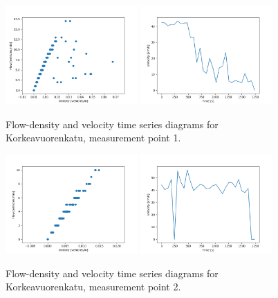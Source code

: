 \documentclass[english, 12pt, a4paper, elec, utf8, pdfa, online]{aaltothesis}
\begin{document}
\clearpage
\begin{figure}[ht!]
    \centering
    \includegraphics[width=0.45\textwidth]{graphs/Korkeavuorenkatu_1_flw_dns.png}
    \includegraphics[width=0.45\textwidth]{graphs/Korkeavuorenkatu_1_spd_time_6.png}
    \caption{Flow-density and velocity time series diagrams for Korkeavuorenkatu, measurement point 1.}
\end{figure}
\begin{figure}[ht!]
    \centering
    \includegraphics[width=0.45\textwidth]{graphs/Korkeavuorenkatu_2_flw_dns.png}
    \includegraphics[width=0.45\textwidth]{graphs/Korkeavuorenkatu_2_spd_time_6.png}
    \caption{Flow-density and velocity time series diagrams for Korkeavuorenkatu, measurement point 2.}
\end{figure}
\end{document}
